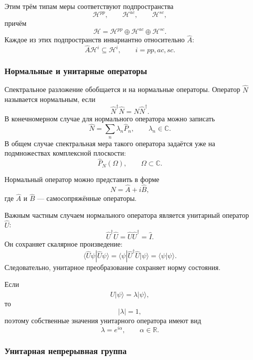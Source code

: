 \documentclass[12pt,a4paper]{article}
\begin{document}
Этим трём типам меры соответствуют подпространства
\[
    \mathcal H^{pp},
    \qquad
    \mathcal H^{ac},
    \qquad
    \mathcal H^{sc},
\]
причём
\[
    \boxed{
        \mathcal H
        =
        \mathcal H^{pp}
        \oplus
        \mathcal H^{ac}
        \oplus
        \mathcal H^{sc}
    }.
\]
Каждое из этих подпространств инвариантно относительно $\hat A$:
\[
    \boxed{
        \hat A\mathcal H^i
        \subseteq
        \mathcal H^i,
        \qquad
        i=pp,ac,sc
    }.
\]


\subsubsection{Нормальные и унитарные операторы}

Спектральное разложение обобщается и на нормальные операторы.
Оператор $\hat N$ называется нормальным, если
\[
    \boxed{
        \hat N^\dagger\hat N
        =
        \hat N\hat N^\dagger
    }.
\]
В конечномерном случае для нормального оператора можно записать
\[
    \hat N
    =
    \sum_n\lambda_n\hat P_n,
    \qquad
    \lambda_n\in\mathbb C.
\]
В общем случае спектральная мера такого оператора задаётся уже на
подмножествах комплексной плоскости:
\[
    \hat P_N(\Omega),
    \qquad
    \Omega\subset\mathbb C.
\]

Нормальный оператор можно представить в форме
\[
    \boxed{
        \hat N=\hat A+i\hat B
    },
\]
где $\hat A$ и $\hat B$ --- самосопряжённые операторы.

Важным частным случаем нормального оператора является унитарный
оператор $\hat U$:
\[
    \boxed{
        \hat U^\dagger\hat U
        =
        \hat U\hat U^\dagger
        =
        \hat I
    }.
\]
Он сохраняет скалярное произведение:
\[
    \langle\hat U\psi|\hat U\psi\rangle
    =
    \langle\psi|
        \hat U^\dagger\hat U
    |\psi\rangle
    =
    \langle\psi|\psi\rangle.
\]
Следовательно, унитарное преобразование сохраняет норму состояния.

Если
\[
    \hat U|\psi\rangle
    =
    \lambda|\psi\rangle,
\]
то
\[
    |\lambda|=1,
\]
поэтому собственные значения унитарного оператора имеют вид
\[
    \boxed{
        \lambda=e^{i\alpha},
        \qquad
        \alpha\in\mathbb R
    }.
\]


\subsubsection{Унитарная непрерывная группа}
\end{document}
